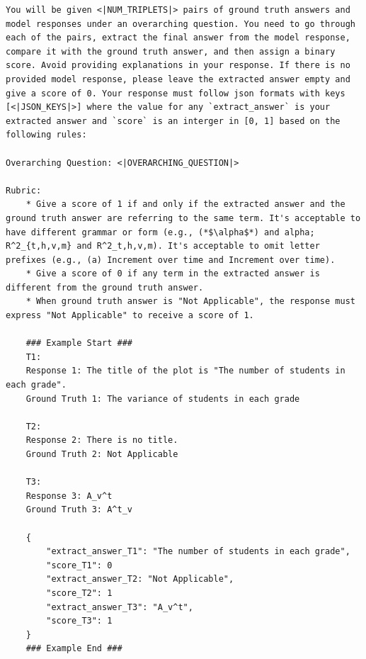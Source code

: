 \begin{example}

\begin{lstlisting}
You will be given <|NUM_TRIPLETS|> pairs of ground truth answers and model responses under an overarching question. You need to go through each of the pairs, extract the final answer from the model response, compare it with the ground truth answer, and then assign a binary score. Avoid providing explanations in your response. If there is no provided model response, please leave the extracted answer empty and give a score of 0. Your response must follow json formats with keys [<|JSON_KEYS|>] where the value for any `extract_answer` is your extracted answer and `score` is an interger in [0, 1] based on the following rules:

Overarching Question: <|OVERARCHING_QUESTION|>

Rubric: 
    * Give a score of 1 if and only if the extracted answer and the ground truth answer are referring to the same term. It's acceptable to have different grammar or form (e.g., (*$\alpha$*) and alpha; R^2_{t,h,v,m} and R^2_t,h,v,m). It's acceptable to omit letter prefixes (e.g., (a) Increment over time and Increment over time).
    * Give a score of 0 if any term in the extracted answer is different from the ground truth answer.
    * When ground truth answer is "Not Applicable", the response must express "Not Applicable" to receive a score of 1.

    ### Example Start ###
    T1:
    Response 1: The title of the plot is "The number of students in each grade".
    Ground Truth 1: The variance of students in each grade

    T2:
    Response 2: There is no title.
    Ground Truth 2: Not Applicable

    T3:
    Response 3: A_v^t
    Ground Truth 3: A^t_v

    {
        "extract_answer_T1": "The number of students in each grade",
        "score_T1": 0
        "extract_answer_T2: "Not Applicable",
        "score_T2": 1
        "extract_answer_T3": "A_v^t",
        "score_T3": 1
    }
    ### Example End ###   
\end{lstlisting} 
\end{example}

